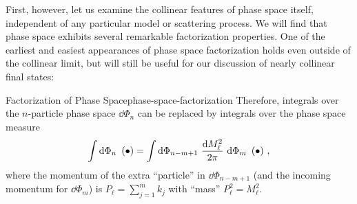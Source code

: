 First, however, let us examine the collinear features of phase space itself, independent of any particular model or scattering process.
%
We will find that phase space exhibits several remarkable factorization properties.
%
One of the earliest and easiest appearances of phase space factorization holds even outside of the collinear limit, but will still be useful for our discussion of nearly collinear final states:

\begin{proposition}{Factorization of Phase Space}{phase-space-factorization}
    Therefore, integrals over the \(n\)-particle phase space \(\dd \Phi_n\) can be replaced by integrals over the  phase space measure
    \begin{align}
        \int \dd \Phi_n
        \,\,
        \left( \bullet \right)
        =
        \int \dd \Phi_{n-m+1}
        \,\,
        \frac{\dd M_\ell^2}{2\pi}
        \,\,
        \dd \Phi_m
        \,\,
        \left( \bullet \right)
        \,,
    \end{align}
    where the momentum of the extra ``particle'' in \(\dd \Phi_{n-m+1}\) (and the incoming momentum for \(\dd \Phi_m\)) is \(P_\ell = \sum_{j=1}^m k_j\) with ``mass'' \(P_\ell^2 = M_\ell^2\).
\end{proposition}

